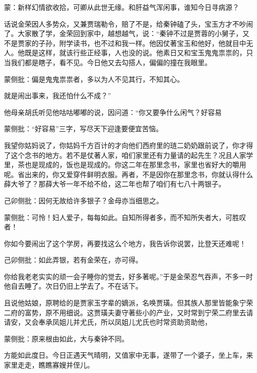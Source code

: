 \begin{parag}

    \begin{note}蒙：新样幻情欲收拾，可卿从此世无缘。和肝益气浑闲事，谁知今日寻病源？\end{note}
\end{parag}

\begin{parag}

    话说金荣因人多势众，又兼贾瑞勒令，赔了不是，给秦钟磕了头，宝玉方才不吵闹了。大家散了学，金荣回到家中，越想越气，说：“秦钟不过是贾蓉的小舅子，又不是贾家的子孙，附学读书，也不过和我一样。他因仗著宝玉和他好，他就目中无人。他既是这样，就该行些正经事，人也没的说。他素日又和宝玉鬼鬼祟祟的，只当我们都是瞎子，看不见。今日他又去勾搭人，偏偏的撞在我眼里。\begin{note}蒙侧批：偏是鬼鬼祟祟者，多以为人不见其行，不知其心。\end{note}就是闹出事来，我还怕什么不成？”
\end{parag}


\begin{parag}


    他母亲胡氏听见他咕咕嘟嘟的说，因问道：“你又要争什么闲气？好容易\begin{note}蒙侧批：“好容易”三字，写尽天下迎逢要便宜苦恼。\end{note}我望你姑妈说了，你姑妈千方百计的才向他们西府里的琏二奶奶跟前说了，你才得了这个念书的地方。若不是仗著人家，咱们家里还有力量请的起先生？况且人家学里，茶也是现成的，饭也是现成的。你这二年在那里念书，家里也省好大的嚼用呢。省出来的，你又爱穿件鲜明衣服。再者，不是因你在那里念书，你就认得什么薛大爷了？那薛大爷一年不给不给，这二年也帮了咱们有七八十两银子。\begin{note}己卯侧批：因何无故给许多银子？金母亦当细思之。\end{note}\begin{note}蒙侧批：可怜！妇人爱子，每每如此。自知所得者多，而不知所失者大，可胜叹者！\end{note}你如今要闹出了这个学房，再要找这么个地方，我告诉你说罢，比登天还难呢！\begin{note}己卯侧批：如此弄银，若有金荣在，亦可得。\end{note}你给我老老实实的顽一会子睡你的觉去，好多著呢。”于是金荣忍气吞声，不多一时他自去睡了。次日仍旧上学去了。不在话下。
\end{parag}


\begin{parag}


    且说他姑娘，原聘给的是贾家玉字辈的嫡派，名唤贾璜。但其族人那里皆能象宁荣二府的富势，原不用细说。这贾璜夫妻守著些小的产业，又时常到宁荣二府里去请请安，又会奉承凤姐儿并尤氏，所以凤姐儿尤氏也时常资助资助他，\begin{note}蒙侧批：原来根由如此，大与秦钟不同。\end{note}方能如此度日。今日正遇天气晴明，又值家中无事，遂带了一个婆子，坐上车，来家里走走，瞧瞧寡嫂并侄儿。
\end{parag}


